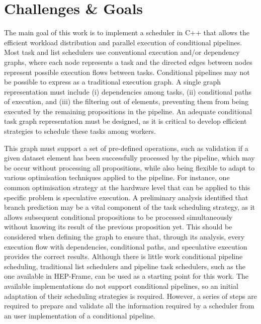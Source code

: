 
\section{Challenges \& Goals}


The main goal of this work is to implement a scheduler in C++ that allows the efficient workload distribution and parallel execution of conditional pipelines. 
Most task and list schedulers use conventional execution and/or dependency graphs, where each node represents a task and the directed edges between nodes represent possible execution flows between tasks.
Conditional pipelines may not be possible to express as a traditional execution graph.
A single graph representation must include (i) dependencies among tasks, (ii) conditional paths of execution, and (iii) the filtering out of elements, preventing them from being executed by the remaining propositions in the pipeline.
An adequate conditional task graph representation must be designed, as it is critical to develop efficient strategies to schedule these tasks among workers.

This graph must support a set of pre-defined operations, such as validation if a given dataset element has been successfully processed by the pipeline, which may be occur without processing all propositions, while also being flexible to adapt to various optimisation techniques applied to the pipeline.
For instance, one common optimisation strategy at the hardware level that can be applied to this specific problem is speculative execution.
A preliminary analysis identified that branch prediction may be a vital component of the task scheduling strategy, as it allows subsequent conditional propositions to be processed simultaneously without knowing its result of the previous proposition yet.
This should be considered when defining the graph to ensure that, through its analysis, every execution flow with dependencies, conditional paths, and speculative execution provides the correct results.
Although there is little work conditional pipeline scheduling, traditional list schedulers and pipeline task schedulers, such as the one available in HEP-Frame, can be used as a starting point for this work.
The available implementations do not support conditional pipelines, so an initial adaptation of their scheduling strategies is required.
However, a series of steps are required to prepare and validate all the information required by a scheduler from an user implementation of a conditional pipeline.

